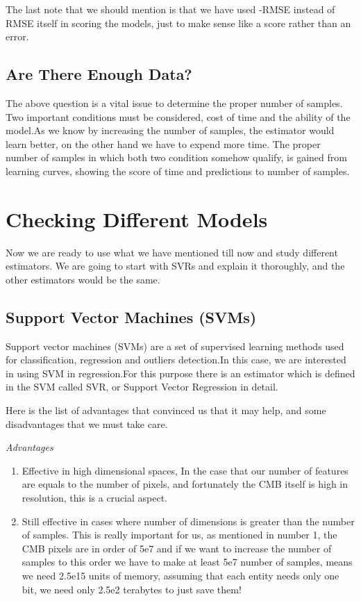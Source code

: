 \documentclass[a4paper,12pt]{article}
\begin{document}
\begin{multicols}{2}
The last note that we should mention is that we have used -RMSE instead of RMSE itself in scoring the models, just to make sense like a score rather than an error.
\subsection{Are There Enough Data?}
\label{section:LR}
The above question is a vital issue to determine the proper number of samples. Two important conditions must be considered, cost of time and the ability of the model.As we know by increasing the number of samples, the estimator would learn better, on the other hand we have to expend more time. The proper number of samples in which both two condition somehow qualify, is gained from learning curves, showing the score of time and predictions to number of samples.
\section{Checking Different Models}
Now we are ready to use what we have mentioned till now and study different estimators. We are going to start with SVRs and explain it thoroughly, and the other estimators would be the same.
\subsection{Support Vector Machines (SVMs)}
Support vector machines (SVMs) are a set of supervised learning methods used for classification, regression and outliers detection\cite{SVM}.In this case, we are interested in using SVM in regression.For this purpose there is an estimator which is defined in the SVM called SVR, or Support Vector Regression in detail.

Here is the list of advantages that convinced us that it may help, and some disadvantages that we must take care.

\emph{Advantages}
\begin{enumerate}
\item 
Effective in high dimensional spaces, In the case that our number of features are equals to the number of pixels, and fortunately the CMB itself is high in resolution, this is a crucial aspect.

\item
Still effective in cases where number of dimensions is greater than the number of samples. This is really important for us, as mentioned in number 1, the CMB pixels are in order of 5e7 and if we want to increase the number of samples to this order we have to make at least 5e7 number of samples, means we need 2.5e15 units of memory, assuming that each entity needs only one bit, we need only 2.5e2 terabytes to just save them!


\end{enumerate}
\end{multicols}
\end{document}
